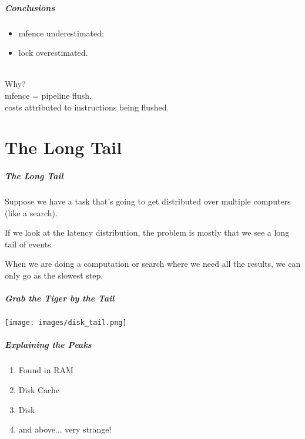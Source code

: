 \begin{frame}
  \frametitle{Conclusions}

  
    \begin{itemize}
    \item mfence underestimated;
      \item lock overestimated.
    \end{itemize}
    ~\\
    Why? \\[1em]
    mfence = pipeline flush,\\
    costs attributed to instructions being flushed.\\
  

\end{frame}

\part{The Long Tail}

\begin{frame}
\partpage
\end{frame}



\begin{frame}
\frametitle{The Long Tail}

Suppose we have a task that's going to get distributed over multiple computers (like a search). 

If we look at the latency distribution, the problem is mostly that we see a long tail of events. 

When we are doing a computation or search where we need all the results, we can only go as the slowest step.

\end{frame}



\begin{frame}
\frametitle{Grab the Tiger by the Tail}

\begin{center}
	\texttt{[image: images/disk\_tail.png]}
\end{center}

\end{frame}



\begin{frame}
\frametitle{Explaining the Peaks}

\begin{enumerate}
	\item Found in RAM
	\item Disk Cache
	\item Disk
	\item and above... very strange!
\end{enumerate}

\end{frame}



